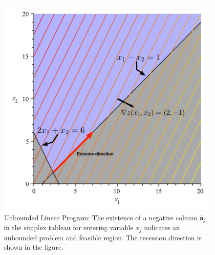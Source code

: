 \begin{example}
\begin{figure}[htbp]
\includegraphics[scale=0.35]{UnboundedFeasibleRegionSimplex.pdf}
\caption{Unbounded Linear Program: The existence of a negative column $\overline{\mathbf{a}}_j$ in the simplex tableau for entering variable $x_j$ indicates an unbounded problem and feasible region. The recession direction is shown in the figure.}
\label{fig:UnboundedFeasibleRegionSimplex}
\end{figure}
\label{ex:UnboundedSolnSimplex}
\end{example}

